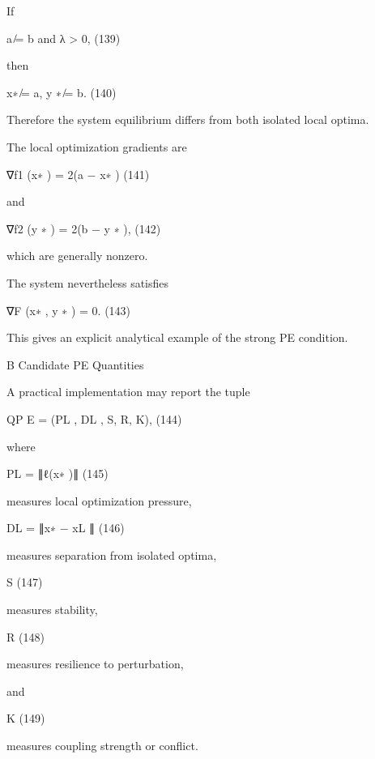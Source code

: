 \documentclass[10pt,a4paper]{article}
\begin{document}
\begin{ManuscriptText}
If


                                        a ̸= b     and    λ > 0,                             (139)

then


                                        x∗ ̸= a,         y ∗ ̸= b.                           (140)

Therefore the system equilibrium differs from both isolated local optima.

The local optimization gradients are


                                       ∇f1 (x∗ ) = 2(a − x∗ )           (141)

and


                                       ∇f2 (y ∗ ) = 2(b − y ∗ ),        (142)

which are generally nonzero.

The system nevertheless satisfies


                                         ∇F (x∗ , y ∗ ) = 0.            (143)

This gives an explicit analytical example of the strong PE condition.


B       Candidate PE Quantities

A practical implementation may report the tuple


                                    QP E = (PL , DL , S, R, K),         (144)

where


                                           PL = ∥ℓ(x∗ )∥                (145)

measures local optimization pressure,


                                         DL = ∥x∗ − xL ∥                (146)

measures separation from isolated optima,


                                                  S                     (147)

measures stability,


                                                  R                     (148)

measures resilience to perturbation,

and


                                               K                                          (149)

measures coupling strength or conflict.


\end{ManuscriptText}
\end{document}
